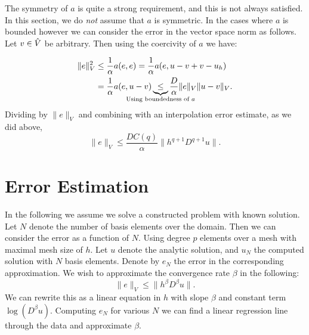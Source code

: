 The symmetry of \( a \) is quite a strong requirement, and this is not always
satisfied. In this section, we do \emph{not} assume that \( a \) is symmetric.
In the cases where \( a \) is bounded however we can consider the error in the
vector space norm as follows. Let \( v \in \hat{V} \) be arbitrary. Then using
the coercivity of \( a \) we have:

\begin{align}
    \| e \|_V^2 &\leq \frac{1}{\alpha} a(e, e) = \frac{1}{\alpha}a(e, u- v + v - u_h) \\
                &= \frac{1}{\alpha} a(e, u - v)
                \underbrace{\leq}_{\mathclap{\text{Using boundedness of \(a
        \)}}} \frac{D}{\alpha}\| e \|_V \| u - v \|_V.
\end{align}
Dividing by \( \|e\|_V \) and combining with an interpolation error estimate,
as we did above, 
\begin{equation}
    \|e \|_V \leq \frac{D C(q)}{\alpha} \|h^{q+1} D^{q+1}u \|.
\end{equation}

\section{Error Estimation}

In the following we assume we solve a constructed problem with known solution.
Let \( N \) denote the number of basis elements over the domain. Then we can
consider the error as a function of \( N \). Using degree \( p \) elements over
a mesh with maximal mesh size of \( h \). Let \( u \) denote the analytic
solution, and \( u_N \) the computed solution with \( N \) basis elements.
Denote by \( e_N \) the error in the corresponding approximation.
We wish to approximate the convergence rate \( \beta \) in the following:
\begin{equation}
    \| e \|_V \leq \| h^\beta D^\beta u \|.
\end{equation}
We can rewrite this as a linear equation in \( h \) with slope \(\beta\) and
constant term \( \log(D^\beta u) \). Computing \( e_N \) for various \( N \) we
can find a linear regression line through the data and approximate \( \beta \).

